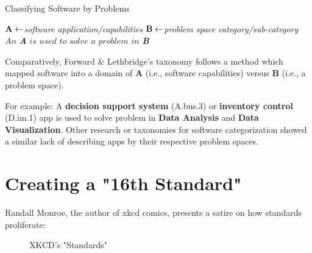 \documentclass[letterpaper, 10 pt, conference]{ieeeconf}
\begin{document}
\begin{algorithm}
  \caption{Classifying Software by Problems}\label{euclid}
  \begin{algorithmic}[1]
  \State $\textit{\bf A} \gets $\textit{software application/capabilities}
  \State $\textit{\bf B} \gets $\textit{problem space category/sub-category}
  \State $\textit{An } $\textit{\bf A} $\textit{is used to solve a problem in } $\textit{\bf B}
  \EndProcedure
  \end{algorithmic}
\end{algorithm}

Comparatively, Forward \& Lethbridge's taxonomy follows a method which mapped software into a domain of \textbf{A} (i.e., software capabilities) versus \textbf{B} (i.e., a problem space).
 
For example: A \textbf{decision support system} (A.bus.3) or \textbf{inventory control} (D.im.1) app is used to solve problem in \textbf{Data Analysis} and \textbf{Data Visualization}.
Other research or taxonomies for software categorization showed a similar lack of describing apps by their respective problem spaces\cite{capiluppi2020towards}\cite{villalon2015taxonomy}\cite{barnes2013software}\cite{kasunic2008data}\cite{usman2015supporting}\cite{stray2020agile}.


\section{Creating a "16th Standard"}
%
%

Randall Monroe, the author of xkcd comics, presents a satire on how standards proliferate:


\begin{figure}[h]
  \centering
  \caption{XKCD's "Standards"\cite{munroe927}}
\end{figure}
\end{document}
